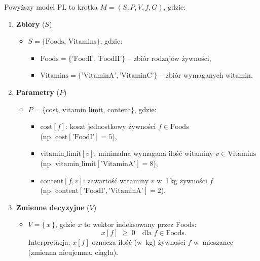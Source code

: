 Powyższy model PL to krotka $M = (S, P, V, f, G)$, gdzie:

\begin{enumerate}
  \item \textbf{Zbiory} (\boldmath$S$)
  \begin{itemize}
    \item $S = \{\text{Foods},\, \text{Vitamins}\}$, gdzie:
    \begin{itemize}
      \item $\text{Foods} = \{\text{'FoodI'}, \text{'FoodII'}\}$ -- zbiór rodzajów żywności,
      \item $\text{Vitamins} = \{\text{'VitaminA'}, \text{'VitaminC'}\}$ -- zbiór wymaganych witamin.
    \end{itemize}
  \end{itemize}

  \item \textbf{Parametry} (\boldmath$P$)
  \begin{itemize}
    \item $P = \{\text{cost},\, \text{vitamin\_limit},\, \text{content}\}$, gdzie:
    \begin{itemize}
      \item $\text{cost}[f]$: koszt jednostkowy żywności $f \in \text{Foods}$ \\
            (np. $\text{cost}[\text{'FoodI'}] = 5$),
      \item $\text{vitamin\_limit}[v]$: minimalna wymagana ilość witaminy $v \in \text{Vitamins}$ \\
            (np. $\text{vitamin\_limit}[\text{'VitaminA'}] = 8$),
      \item $\text{content}[f,v]$: zawartość witaminy $v$ w~1\,kg żywności $f$ \\
            (np. $\text{content}[\text{'FoodI'}, \text{'VitaminA'}] = 2$).
    \end{itemize}
  \end{itemize}

  \item \textbf{Zmienne decyzyjne} (\boldmath$V$)
  \begin{itemize}
    \item $V = \{\,x\,\}$, gdzie $x$ to wektor indeksowany przez $\text{Foods}$:
    \[
      x[f] \;\geq\; 0 \quad\text{dla}\; f \in \text{Foods}.
    \]
    Interpretacja: $x[f]$ oznacza ilość (w~kg) żywności $f$ w~mieszance (zmienna nieujemna, ciągła).
  \end{itemize}


\end{enumerate}
